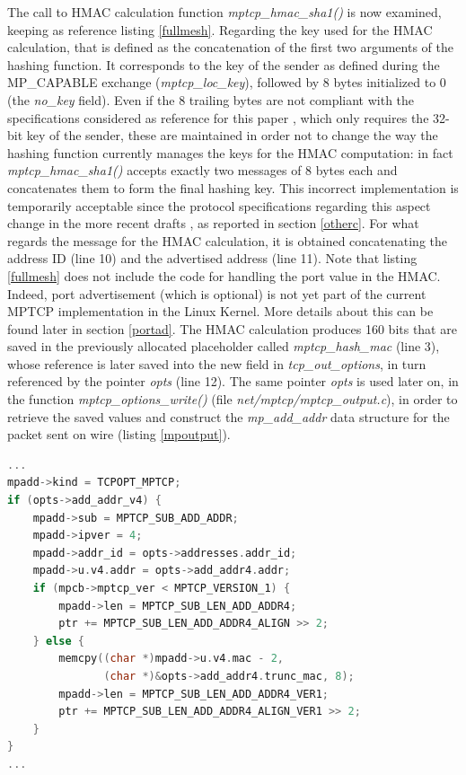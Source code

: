 The call to HMAC calculation function \textit{mptcp\_hmac\_sha1()} is now examined, keeping as reference listing \ref{fullmesh}. Regarding the key used for the HMAC calculation, that is defined as the concatenation of the first two arguments of the hashing function. It corresponds to the key of the sender as defined during the MP\_CAPABLE exchange (\textit{mptcp\_loc\_key}), followed by 8 bytes initialized to 0 (the \textit{no\_key} field). Even if the 8 trailing bytes are not compliant with the specifications considered as reference for this paper \cite{rfc6824bis04}, which only requires the 32-bit key of the sender, these are maintained in order not to change the way the hashing function currently manages the keys for the HMAC computation: in fact \textit{mptcp\_hmac\_sha1()} accepts exactly two messages of 8 bytes each and concatenates them to form the final hashing key. This incorrect implementation is temporarily acceptable since the protocol specifications regarding this aspect change in the more recent drafts \cite{rfc6824bis05}, as reported in section \ref{otherc}.
For what regards the message for the HMAC calculation, it is obtained concatenating the address ID (line 10) and the advertised address (line 11). Note that listing \ref{fullmesh} does not include the code for handling the port value in the HMAC. Indeed, port advertisement (which is optional) is not yet part of the current MPTCP implementation in the Linux Kernel. More details about this can be found later in section \ref{portad}.
The HMAC calculation produces 160 bits that are saved in the previously allocated placeholder called \textit{mptcp\_hash\_mac} (line 3), whose reference is later saved into the new field in \textit{tcp\_out\_options}, in turn referenced by the pointer \textit{opts} (line 12). The same pointer \textit{opts} is used later on, in the function \textit{mptcp\_options\_write()} (file \textit{net/mptcp/mptcp\_output.c}), in order to retrieve the saved values and construct the \textit{mp\_add\_addr} data structure for the packet sent on wire (listing \ref{mpoutput}).

\begin{lstlisting}[language=c, caption=Building ADD\_ADDR2 outgoing message, label=mpoutput]
...
mpadd->kind = TCPOPT_MPTCP;
if (opts->add_addr_v4) {
	mpadd->sub = MPTCP_SUB_ADD_ADDR;
	mpadd->ipver = 4;
	mpadd->addr_id = opts->addresses.addr_id;
	mpadd->u.v4.addr = opts->add_addr4.addr;
	if (mpcb->mptcp_ver < MPTCP_VERSION_1) {
		mpadd->len = MPTCP_SUB_LEN_ADD_ADDR4;
		ptr += MPTCP_SUB_LEN_ADD_ADDR4_ALIGN >> 2;
	} else {
		memcpy((char *)mpadd->u.v4.mac - 2,
	           (char *)&opts->add_addr4.trunc_mac, 8);
		mpadd->len = MPTCP_SUB_LEN_ADD_ADDR4_VER1;
		ptr += MPTCP_SUB_LEN_ADD_ADDR4_ALIGN_VER1 >> 2;
	}
}
...
\end{lstlisting}

